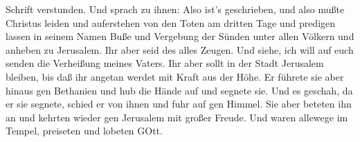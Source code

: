 Schrift verstunden.  Und sprach zu ihnen: Also ist's
geschrieben, und also mußte Christus leiden und auferstehen von den
Toten am dritten Tage  und predigen lassen in seinem Namen
Buße und Vergebung der Sünden unter allen Völkern und anheben zu
Jerusalem.  Ihr aber seid des alles Zeugen. 
Und siehe, ich will auf euch senden die Verheißung meines Vaters. Ihr
aber sollt in der Stadt Jerusalem bleiben, bis daß ihr angetan werdet
mit Kraft aus der Höhe.  Er führete sie aber hinaus gen
Bethanien und hub die Hände auf und segnete sie.  Und es
geschah, da er sie segnete, schied er von ihnen und fuhr auf gen Himmel.
 Sie aber beteten ihn an und kehrten wieder gen Jerusalem
mit großer Freude.  Und waren allewege im Tempel, preiseten
und lobeten GOtt.
